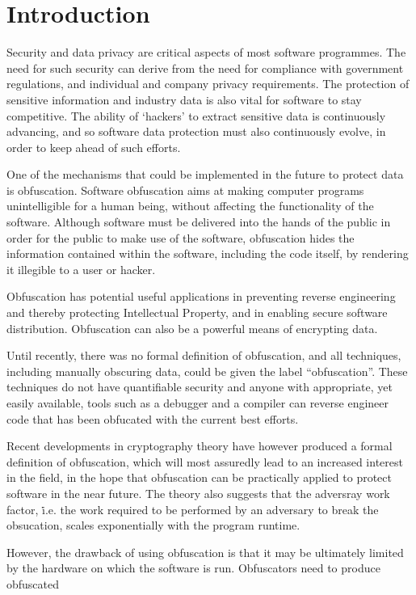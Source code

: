 \section{Introduction}
Security and data privacy are critical aspects of most software programmes. The
need for such security can derive from the need for compliance with government
regulations, and individual and company privacy requirements. The protection of
sensitive information and industry data is also vital for software to stay
competitive. The ability of ‘hackers’ to extract sensitive data is continuously
advancing, and so software data protection must also continuously evolve, in
order to keep ahead of such efforts.
\par
One of the mechanisms that could be implemented in the future to protect data is
obfuscation. Software obfuscation aims at making computer programs unintelligible
for a human being, without affecting the functionality of the software. Although
software must be delivered into the hands of the public in order for the public
to make use of the software, obfuscation hides the information contained within
the software, including the code itself, by rendering it illegible to a user or
hacker.
\par
Obfuscation has potential useful applications in preventing reverse engineering
and thereby protecting Intellectual Property, and in enabling secure software
distribution. Obfuscation can also be a powerful means of encrypting data.
\par
Until recently, there was no formal definition of obfuscation, and all techniques,
including manually obscuring data, could be given the label “obfuscation”. These
techniques do not have quantifiable security and anyone with appropriate, yet easily
available, tools such as a debugger and a compiler can reverse engineer code that
has been obfucated with the current best efforts\cite{hsieh}.
\par
Recent developments in cryptography theory have however produced a formal definition of
obfuscation, which will most assuredly lead to an increased interest in the field,
in the hope that obfuscation can be practically applied to protect software in the
near future. The theory also suggests that the adversray work factor, \.i.e. the
work required to be performed by an adversary to break the obsucation, scales exponentially
with the program runtime.\cite{hsieh}
\par
However, the drawback of using obfuscation is that it may be ultimately limited
by the hardware on which the software is run. Obfuscators need to produce obfuscated
